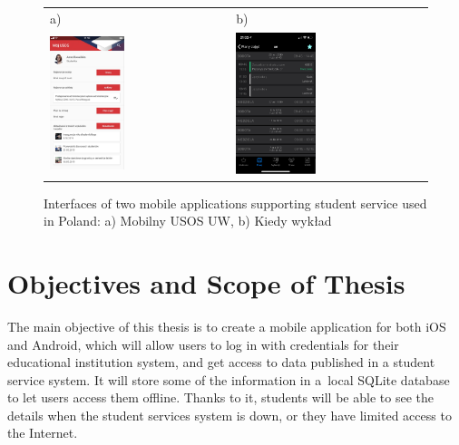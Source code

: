 \begin{figure}[htb]
    \centering
    \begin{tabular}{@{}ll@{}}
        a) & b) \\
        \includegraphics[width=0.43\textwidth]{fig01/mobilny-usos.png} &
        \includegraphics[width=0.43\textwidth]{fig01/kiedy-wyklad.png} \\
    \end{tabular}
    \caption{Interfaces of two mobile applications supporting student service used in Poland: a) Mobilny USOS UW, b) Kiedy wykład} \label{fig:similar-solutions}
\end{figure}

\section{Objectives and Scope of Thesis}
The main objective of this thesis is to create a mobile application for both iOS and Android, which will allow users to log in with credentials for their educational institution system, and get access to data published in a student service system. It will store some of the information in a~local SQLite database to let users access them offline. Thanks to it, students will be able to see the details when the student services system is down, or they have limited access to the Internet. \\

